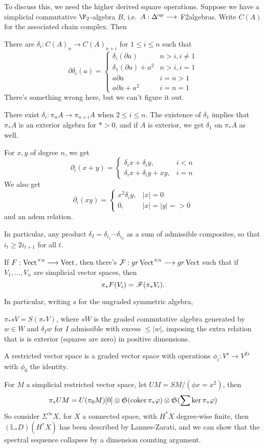 \documentclass[11pt]{article}
\begin{document}
\begin{RuneBabytop}
To discuss this, we need the higher derived square operations. Suppose we have a simplicial commutative $\F_2$-algebra $B$, i.e.\ $A:\Delta^{\textup{op}}\longrightarrow$ F2algebras. Write $C(A)$ for the associated chain complex. Then
\begin{prop*}
There are $\delta_i:C(A)_n\to C(A)_{n+i}$ for $1\leq i\leq n$ such that
\[\partial\delta_i(a)=\begin{cases}
\delta_i(\partial a)&n>i,i\neq1\\
\delta_1(\partial a)+a^2&n>i,i=1\\
a\partial a&i=n>1\\
a\partial a+a^2&i=n=1
\end{cases}\]
There's something wrong here, but we can't figure it out.
\end{prop*}
\begin{cor*}
There exist $\delta_i:\pi_n A\to \pi_{n+i} A$ when $2\leq i\leq n$. The existence of $\delta_1$ implies that $\pi_*A$ is an exterior algebra for $*>0$, and if $A$ is exterior, we get $\delta_1$ on $\pi_*A$ as well.
\end{cor*}
\begin{thm*}
For $x,y$ of degree $n$, we get
\[\partial_i(x+y)=\begin{cases}\delta_i x+\delta_i y,&i<n\\\delta_i x+\delta_i y+xy,&i=n\end{cases}\]
We also get
\[\partial_i(xy)=\begin{cases}x^2\delta_i y,&|x|=0\\0,&|x|=|y|=>0\end{cases}\]
and an adem relation.
\end{thm*}
In particular, any product $\delta_I=\delta_{i_1}\cdots\delta_{i_k}$ as a sum of admissible composites, so that $i_t\geq2i_{t+1}$ for all $t$.
\begin{thm*}[Dold]
If $F:\operatorname{Vect}^{\times n}\longrightarrow\operatorname{Vect}$, then there's $\mathcal{F}:gr\operatorname{Vect}^{\times n}\longrightarrow gr\operatorname{Vect}$ such that if $V_1,\ldots, V_n$ are simplicial vector spaces, then
\[\pi_*F(V_i)=\mathscr{F}(\pi_*V_i).\]
\end{thm*}
In particular, writing $s$ for the ungraded symmetric algebra,
\begin{thm*}
$\pi_*sV=S(\pi_*V)$, where $sW$ is the graded commutative algebra generated by $w\in W$ and $\delta_Iw$ for $I$ admissible with excess $\leq |w|$, imposing the extra relation that is is exterior (squares are zero) in positive dimensions.
\end{thm*}
\begin{defn*}
A restricted vector space is a graded vector space with operations $\phi_i:V^s\to V^{2s}$ with $\phi_0$ the identity.
\end{defn*}
\begin{prop*}
For $M$ a simplicial restricted vector space, let $UM=SM/(\phi x=x^2)$, then
\[\pi_*UM=U(\pi_0M)[0]\otimes\mathfrak{S}(\operatorname{coker}\pi_*\varphi)\otimes\mathfrak{S}(\sum\textup{ker}\,\pi_*\varphi)\]
So consider $\Sigma^\infty X$, for $X$ a connected space, with $H^*X$ degree-wise finite, then $(\mathbb{L}_*D)(H^*X)$ has been described by Lannes-Zarati, and we can show that the spectral sequence collapses by a dimension counting argument.
\end{prop*}


\end{RuneBabytop}
\end{document}
